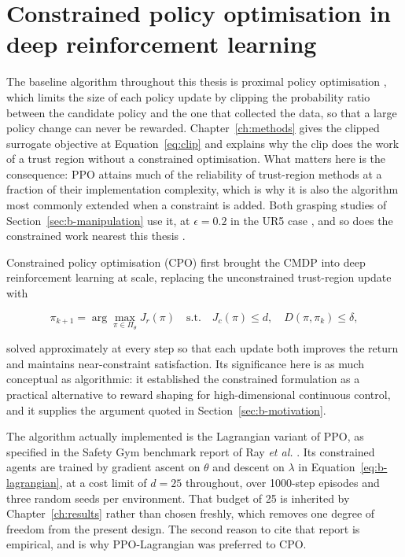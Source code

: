 \section{Constrained policy optimisation in deep reinforcement learning}\label{sec:b-cpo}

The baseline algorithm throughout this thesis is proximal policy optimisation
\cite{schulman2017ppo}, which limits the size of each policy update by clipping the probability
ratio between the candidate policy and the one that collected the data, so that a large policy
change can never be rewarded. Chapter~\ref{ch:methods} gives the clipped surrogate objective at
Equation~\eqref{eq:clip} and explains why the clip does the work of a trust region without a
constrained optimisation. What matters here is the consequence: PPO attains much of the
reliability of trust-region methods at a fraction of their implementation complexity, which is
why it is also the algorithm most commonly extended when a constraint is added. Both grasping
studies of Section~\ref{sec:b-manipulation} use it, at \(\epsilon=0.2\) in the UR5 case
\cite{ferreira2025grasping}, and so does the constrained work nearest this thesis
\cite{khan2026rl_precision_grasping}.

Constrained policy optimisation (CPO) \cite{achiam2017cpo} first brought the CMDP into deep
reinforcement learning at scale, replacing the unconstrained trust-region update with

\begin{equation}\label{eq:b-cpo}
\pi_{k+1}=\arg\max_{\pi\in\Pi_{\theta}} J_{r}(\pi)
\quad\text{s.t.}\quad J_{c}(\pi)\le d,\quad D(\pi,\pi_{k})\le\delta,
\end{equation}

solved approximately at every step so that each update both improves the return and maintains
near-constraint satisfaction. Its significance here is as much conceptual as algorithmic: it
established the constrained formulation as a practical alternative to reward shaping for
high-dimensional continuous control, and it supplies the argument quoted in
Section~\ref{sec:b-motivation}.

The algorithm actually implemented is the Lagrangian variant of PPO, as specified in the Safety
Gym benchmark report of Ray \emph{et al.} \cite{ray2019benchmarking}. Its constrained agents are
trained by gradient ascent on \(\theta\) and descent on \(\lambda\) in
Equation~\eqref{eq:b-lagrangian}, at a cost limit of \(d=25\) throughout, over 1000-step episodes
and three random seeds per environment. That budget of 25 is inherited by Chapter~\ref{ch:results}
rather than chosen freshly, which removes one degree of freedom from the present design. The
second reason to cite that report is empirical, and is why PPO-Lagrangian was preferred to CPO.

